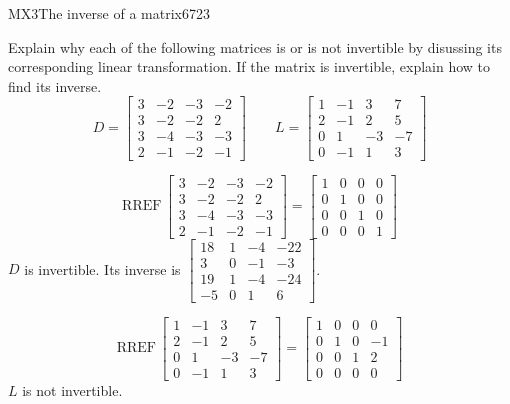 \begin{exercise}{MX3}{The inverse of a matrix}{6723} 
\begin{exerciseStatement} 

 Explain why each of the following matrices is or is not invertible by disussing its corresponding linear transformation. If the matrix is invertible, explain how to find its inverse. \[
\hspace{2em}
D = \left[\begin{array}{cccc}
3 & -2 & -3 & -2 \\
3 & -2 & -2 & 2 \\
3 & -4 & -3 & -3 \\
2 & -1 & -2 & -1
\end{array}\right]
\hspace{2em}
L = \left[\begin{array}{cccc}
1 & -1 & 3 & 7 \\
2 & -1 & 2 & 5 \\
0 & 1 & -3 & -7 \\
0 & -1 & 1 & 3
\end{array}\right]
\hspace{2em}
        \] 

 \end{exerciseStatement}
 \begin{exerciseAnswer} 

 \[\mathrm{RREF}\,\left[\begin{array}{cccc}
3 & -2 & -3 & -2 \\
3 & -2 & -2 & 2 \\
3 & -4 & -3 & -3 \\
2 & -1 & -2 & -1
\end{array}\right]=\left[\begin{array}{cccc}
1 & 0 & 0 & 0 \\
0 & 1 & 0 & 0 \\
0 & 0 & 1 & 0 \\
0 & 0 & 0 & 1
\end{array}\right]\] \(D\) is invertible. Its inverse is \(\left[\begin{array}{cccc}
18 & 1 & -4 & -22 \\
3 & 0 & -1 & -3 \\
19 & 1 & -4 & -24 \\
-5 & 0 & 1 & 6
\end{array}\right]\). 

 

 \[\mathrm{RREF}\,\left[\begin{array}{cccc}
1 & -1 & 3 & 7 \\
2 & -1 & 2 & 5 \\
0 & 1 & -3 & -7 \\
0 & -1 & 1 & 3
\end{array}\right]=\left[\begin{array}{cccc}
1 & 0 & 0 & 0 \\
0 & 1 & 0 & -1 \\
0 & 0 & 1 & 2 \\
0 & 0 & 0 & 0
\end{array}\right]\] \(L\) is not invertible. 

 \end{exerciseAnswer}
 \end{exercise}


